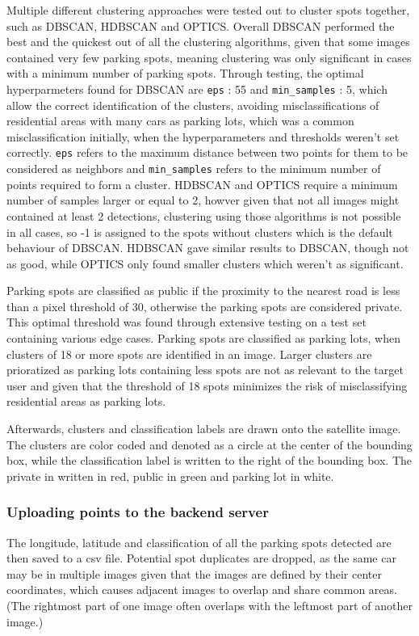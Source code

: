 Multiple different clustering approaches were tested out to cluster spots together, such as DBSCAN, HDBSCAN and OPTICS.
Overall DBSCAN performed the best and the quickest out of all the clustering algorithms, given that some images contained very few parking spots, meaning clustering was only significant in cases with a minimum number of parking spots.
Through testing, the optimal hyperparmeters found for DBSCAN are \texttt{eps} : 55 and \texttt{min\_samples} : 5, which allow the correct identification of the clusters, avoiding misclassifications of residential areas with many cars as parking lots, which was a common misclassification initially, when the hyperparameters and thresholds weren't set correctly.
\texttt{eps} refers to the maximum distance between two points for them to be considered as neighbors and \texttt{min\_samples} refers to the minimum number of points required to form a cluster.
HDBSCAN and OPTICS require a minimum number of samples larger or equal to 2, howver given that not all images might contained at least 2 detections, clustering using those algorithms is not possible in all cases, so -1 is assigned to the spots without clusters which is the default behaviour of DBSCAN.
HDBSCAN gave similar results to DBSCAN, though not as good, while OPTICS only found smaller clusters which weren't as significant.

Parking spots are classified as public if the proximity to the nearest road is less than a pixel threshold of 30, otherwise the parking spots are considered private. This optimal threshold was found through extensive testing on a test set containing various edge cases.
Parking spots are classified as parking lots, when clusters of 18 or more spots are identified in an image. Larger clusters are prioratized as parking lots containing less spots are not as relevant to the target user and given that the threshold of 18 spots minimizes the risk of misclassifying residential areas as parking lots.

Afterwards, clusters and classification labels are drawn onto the satellite image. The clusters are color coded and denoted as a circle at the center of the bounding box, while the classification label is written to the right of the bounding box. The private in written in red, public in green and parking lot in white.

\subsubsection{Uploading points to the backend server}
The longitude, latitude and classification of all the parking spots detected are then saved to a csv file.
Potential spot duplicates are dropped, as the same car may be in multiple images given that the images are defined by their center coordinates, which causes adjacent images to overlap and share common areas. (The rightmost part of one image often overlaps with the leftmost part of another image.)

